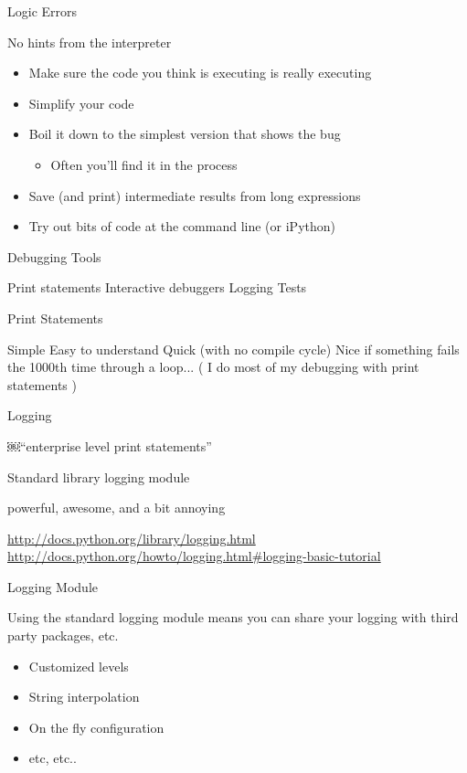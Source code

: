 \documentclass{beamer}
\begin{document}
\begin{frame}[fragile]{Logic Errors}

{\LARGE No hints from the interpreter}

\vfill
\begin{itemize}
  \item Make sure the code you think is executing is really executing
  \item Simplify your code
  \item Boil it down to the simplest version that shows the bug
  \begin{itemize}
    \item Often you'll find it in the process
  \end{itemize}
  \item Save (and print) intermediate results from long expressions
  \item Try out bits of code at the command line (or iPython)
\end{itemize}

\end{frame} 

\begin{frame}[fragile]{Debugging Tools}

{\LARGE
\vfill
Print statements
\vfill
Interactive debuggers
\vfill
Logging
\vfill
Tests
}
\end{frame} 

\begin{frame}[fragile]{Print Statements}

{\LARGE
\vfill
Simple
\vfill
Easy to understand
\vfill
Quick (with no compile cycle)
\vfill
Nice if something fails the 1000th time through a loop...
}
\vfill
( I do most of my debugging with print statements )
\end{frame} 

\begin{frame}[fragile]{Logging}

{\LARGE ￼``enterprise level print statements''}

\vfill
Standard library logging module

\vfill
powerful, awesome, and a bit annoying

\vfill
\url{http://docs.python.org/library/logging.html}
\url{http://docs.python.org/howto/logging.html#logging-basic-tutorial}

\end{frame} 

\begin{frame}[fragile]{Logging Module}

{\LARGE Using the standard logging module means you can share your logging with third
party packages, etc.}

\vfill
\begin{itemize}
  \item Customized levels
  \item String interpolation
  \item On the fly configuration
  \item etc, etc..
\end{itemize}

\end{frame} 
\end{document}

